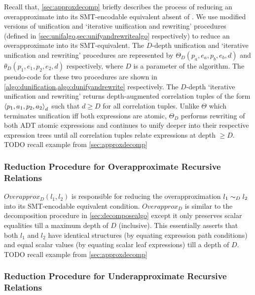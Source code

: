 Recall that, \cref{sec:approxdecomp} briefly describes the process of reducing an
overapproximate \recursiveRelation{} into its SMT-encodable equivalent absent of \recursiveRelations{}.
We use modified versions of unification and `iterative unification and rewriting' procedures
(defined in \cref{sec:unifalgo,sec:unifyandrewritealgo} respectively) to
reduce an overapproximate \recursiveRelation{} into its SMT-equivalent.
The $D$-depth unification and `iterative unification and rewriting' procedures
are represented by $\Theta_D(p_a,e_a,p_b,e_b,d)$ and $\theta_D(p_1,e_1,p_2,e_2,d)$
respectively, where $D$ is a parameter of the algorithm.
The pseudo-code for these two procedures are shown in \cref{algo:dunification,algo:dunifyandrewrite} respectively.
The $D$-depth `iterative unification and rewriting' returns depth-augmented
correlation tuples of the form ${\langle p_1, a_1, p_2, a_2 \rangle}_d$ such that $d \geq D$
for all correlation tuples.
Unlike $\Theta$ which terminates unification iff both expressions are atomic,
$\Theta_D$ performs rewriting of both ADT atomic expressions and continues to
unify deeper into their respective expression trees until all correlation tuples relate
expressions at depth $\geq D$. TODO recall example from \cref{sec:approxdecomp}

\subsubsection{Reduction Procedure for Overapproximate Recursive Relations}
\label{sec:overapproxalgo}



$Overapprox_D(l_1,l_2)$ is responsible for reducing the overapproximation $l_1 \sim_{D} l_2$
into its SMT-encodable equivalent condition.
$Overapprox_D$ is similar to the decomposition procedure in \cref{sec:decomposealgo} except it only preserves
scalar equalities till a maximum depth of $D$ (inclusive).
This essentially asserts that both $l_1$ and $l_2$ have identical structures (by equating expression path conditions)
and equal scalar values (by equating scalar leaf expressions) till a depth of $D$.
TODO recall example from \cref{sec:approxdecomp}

\subsubsection{Reduction Procedure for Underapproximate Recursive Relations}
\label{sec:underapproxalgo}

